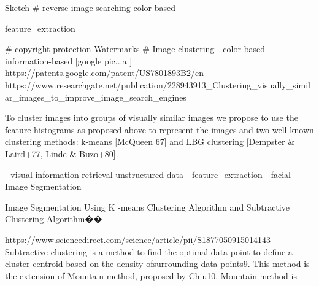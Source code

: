 Sketch
# reverse image searching
    color-based

    feature_extraction   

# copyright protection
    Watermarks  
# Image clustering
    - color-based
    - information-based [google pic...a ]
    https://patents.google.com/patent/US7801893B2/en  
    https://www.researchgate.net/publication/228943913_Clustering_visually_similar_images_to_improve_image_search_engines  {

To cluster images into groups of visually similar images we propose to use the feature histograms as proposed above to represent the images and two well known clustering methods: k-means [McQueen 67] and LBG clustering [Dempster & Laird+77, Linde & Buzo+80]. 
    }
        - visual information retrieval
         unstructured data
        - feature_extraction   
        - facial 
        - Image Segmentation  

Image Segmentation Using K -means Clustering Algorithm and Subtractive Clustering Algorithm��{
https://www.sciencedirect.com/science/article/pii/S1877050915014143
Subtractive clustering is a method to find the optimal data point to define a cluster centroid based on the density ofsurrounding data points9. This method is the extension of Mountain method, proposed by Chiu10. Mountain method is

}




